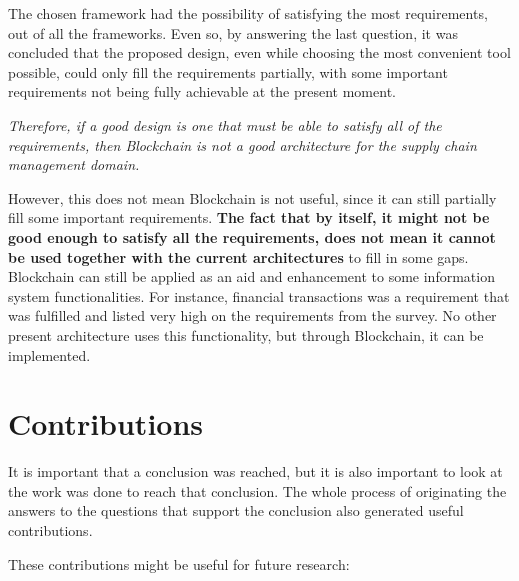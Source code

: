 \par The chosen framework had the possibility of satisfying the most requirements, out of all the frameworks. Even so, by answering the last question, it was concluded that the proposed design, even while choosing the most convenient tool possible, could only fill the requirements partially, with some important requirements not being fully achievable at the present moment.


\emph{Therefore, if a good design is one that must be able to satisfy all of the requirements, then Blockchain is not a good architecture for the supply chain management domain.}


However, this does not mean Blockchain is not useful, since it can still partially fill some important requirements. \textbf{The fact that by itself, it might not be good enough to satisfy all the requirements, does not mean it cannot be used together with the current architectures} to fill in some gaps. Blockchain can still be applied as an aid and enhancement to some information system functionalities. For instance, financial transactions was a requirement that was fulfilled and listed very high on the requirements from the survey. No other present architecture uses this functionality, but through Blockchain, it can be implemented.

\section{Contributions}
It is important that a conclusion was reached, but it is also important to look at the work was done to reach that conclusion. The whole process of originating the answers to the questions that support the conclusion also generated useful contributions. 

These contributions might be useful for future research:

